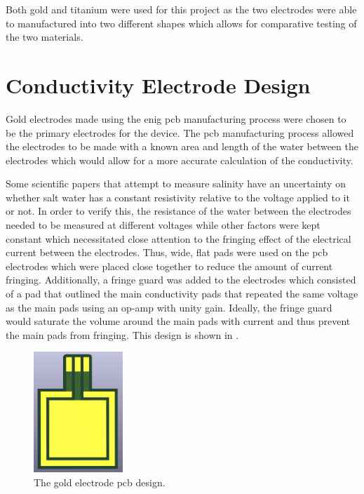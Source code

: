 Both gold and titanium were used for this project as the two electrodes were able to manufactured into two different shapes which allows for comparative testing of the two materials.

\section{Conductivity Electrode Design}

Gold electrodes made using the \gls{enig} \gls{pcb} manufacturing process were chosen to be the primary electrodes for the device.
The \gls{pcb} manufacturing process allowed the electrodes to be made with a known area and length of the water between the electrodes which would allow for a more accurate calculation of the conductivity.

Some scientific papers that attempt to measure salinity have an uncertainty on whether salt water has a constant resistivity relative to the voltage applied to it or not.
In order to verify this, the resistance of the water between the electrodes needed to be measured at different voltages while other factors were kept constant which necessitated close attention to the fringing effect of the electrical current between the electrodes.
Thus, wide, flat pads were used on the \gls{pcb} electrodes which were placed close together to reduce the amount of current fringing.
Additionally, a fringe guard was added to the electrodes which consisted of a pad that outlined the main conductivity pads that repeated the same voltage as the main pads using an op-amp with unity gain.
Ideally, the fringe guard would saturate the volume around the main pads with current and thus prevent the main pads from fringing.
This design is shown in .

\begin{figure}
    \centering
    \includegraphics[width=0.3\textwidth]{Figures/GoldElectrode}
    \caption{The gold electrode \gls{pcb} design.}
    \label{fig:gold-electrode} %
\end{figure}

